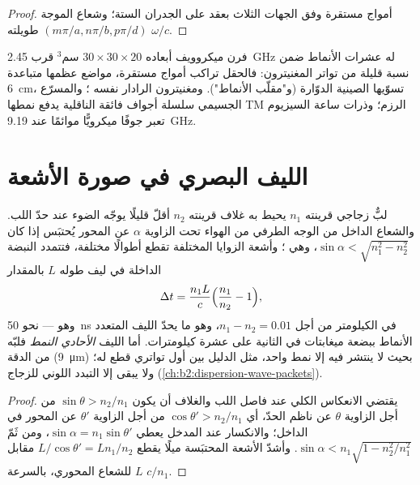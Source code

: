 \begin{proof}
أمواج مستقرة وفق الجهات الثلاث بعقد على الجدران الستة؛
وشعاع الموجة $(m\pi/a, n\pi/b, p\pi/d)$ طويلته $\omega/c$.
\end{proof}

\begin{example}\label{ex:b2:guided-waves:cavities}
فرن ميكروويف أبعاده $30 \times 30 \times 20$ سم$^3$ قرب \qty{2.45}{GHz} له
عشرات الأنماط ضمن نسبة قليلة من تواتر المغنيترون:
فالحقل تراكب أمواج مستقرة، مواضع عظمها متباعدة
\qty{6}{cm}، تسوّيها الصينية الدوّارة (و"مقلّب الأنماط").
ومغنيترون الرادار نفسه ؛ والمسرّع
الجسيمي سلسلة أجواف فائقة الناقلية يدفع نمطها TM
الرزم؛ وذرات ساعة السيزيوم تعبر جوفًا ميكرويًّا
موائمًا عند \qty{9.19}{GHz}.
\end{example}

\section{الليف البصري في صورة الأشعة}

\begin{proposition}\label{prop:b2:guided-waves:fibre}
لبٌّ زجاجي قرينته $n_1$ يحيط به غلاف قرينته $n_2$ أقلّ قليلًا
يوجّه الضوء  عند حدّ اللب.
والشعاع الداخل من الوجه الطرفي من الهواء تحت الزاوية $\alpha$ عن
المحور يُحتبَس إذا كان $\sin\alpha < \sqrt{n_1^2 - n_2^2}$، وهي \emph{}؛ وأشعة الزوايا المختلفة تقطع أطوالًا مختلفة، فتتمدد
النبضة الداخلة في ليف طوله $L$ بالمقدار
\[
\Delta t = \frac{n_1L}c\Bigl(\frac{n_1}{n_2} - 1\Bigr) ,
\]
وهو \emph{} --- نحو \qty{50}{ns} في الكيلومتر من أجل $n_1
- n_2 = 0.01$، وهو ما يحدّ الليف المتعدد الأنماط ببضعة ميغابتات في
الثانية على عشرة كيلومترات. أما الليف \emph{الأحادي النمط} فلبّه
من الدقة (\qty{9}{\micro m}) بحيث لا ينتشر فيه إلا نمط واحد، مثل الدليل
بين أول تواتري قطع له؛ ولا يبقى إلا التبدد
اللوني للزجاج (\cref{ch:b2:dispersion-wave-packets}).
\end{proposition}

\begin{proof}
يقتضي الانعكاس الكلي عند فاصل اللب والغلاف أن يكون $\sin\theta >
n_2/n_1$ من أجل الزاوية $\theta$ عن ناظم الحدّ، أي $\cos
\theta' > n_2/n_1$ من أجل الزاوية $\theta'$ عن المحور في الداخل؛ والانكسار
عند المدخل يعطي $\sin\alpha = n_1\sin\theta'$، ومن ثَمّ $\sin\alpha < n_1\sqrt{1
- n_2^2/n_1^2}$. وأشدّ الأشعة المحتبَسة ميلًا يقطع $L/\cos\theta' = Ln_1/n_2$
مقابل $L$ للشعاع المحوري، بالسرعة $c/n_1$.
\end{proof}

